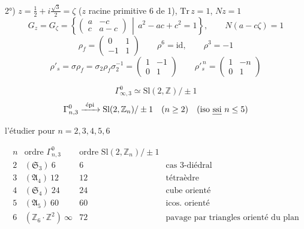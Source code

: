 \documentclass[11pt,a4paper]{article}
\begin{document}
2°) $z = \frac12 + i\frac{\sqrt3}{2} = \zeta$ ($z$ racine primitive 6 de 1), $\mathrm{Tr}\,z = 1$, $Nz = 1$
\[
G_z = G_\zeta = \left\{ \begin{pmatrix} a & -c \\ c & a-c \end{pmatrix} \,\middle|\, a^2 - ac + c^2 = 1 \right\},
\qquad N(a - c\zeta) = 1
\]
\[
\boxed{\rho_f = \begin{pmatrix} 0 & 1 \\ -1 & 1 \end{pmatrix}}
\qquad \rho^6 = \mathrm{id}, \qquad \boxed{\rho^3 = -1}
\]
\[
\boxed{\rho'_s = \sigma\rho_f = \sigma_2\rho_f\sigma_2^{-1} = \begin{pmatrix} 1 & -1 \\ 0 & 1 \end{pmatrix}}
\qquad \rho'^{\,n}_s = \begin{pmatrix} 1 & -n \\ 0 & 1 \end{pmatrix}
\]

\[
\Gamma^0_{\infty,3} \simeq \mathrm{Sl}(2,\mathbb{Z})/\pm 1
\]
\[
\Gamma^0_{n,3} \xrightarrow{\ \text{épi}\ } \mathrm{Sl}(2,\mathbb{Z}_n)/\pm 1 \quad (n \geq 2) \quad (\text{iso \emph{ssi} } n \leq 5)
\]

l'étudier pour \emph{$n = 2, 3, 4, 5, 6$}

\[
\begin{array}{c|c|c|l}
n & \text{ordre } \Gamma^0_{n,3} & \text{ordre } \mathrm{Sl}(2,\mathbb{Z}_n)/\pm 1 & \\ \hline
2 & (\mathfrak{S}_3)\ 6 & 6 & \text{cas 3-diédral} \\
3 & (\mathfrak{A}_4)\ 12 & 12 & \text{tétraèdre} \\
4 & (\mathfrak{S}_4)\ 24 & 24 & \text{cube orienté} \\
5 & (\mathfrak{A}_5)\ 60 & 60 & \text{icos. orienté} \\
6 & (\mathbb{Z}_6\cdot\mathbb{Z}^2)\ \infty & 72 & \text{pavage par triangles orienté du plan}
\end{array}
\]
\end{document}

